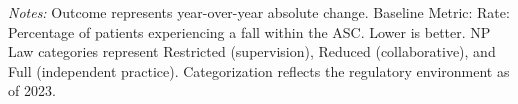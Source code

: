 \begin{table}[htbp]
    \centering
    \caption{Summary of Change in ASC-2: Patient Falls Rate by Authority and Year}
    \label{tab:d_asc_rate_2}
    \vspace{0.2cm}
    \vspace{0.1cm}
    \begin{minipage}{\textwidth}
        \footnotesize \textit{Notes:} Outcome represents year-over-year absolute change. Baseline Metric: Rate: Percentage of patients experiencing a fall within the ASC. Lower is better. NP Law categories represent Restricted (supervision), Reduced (collaborative), and Full (independent practice). Categorization reflects the regulatory environment as of 2023.
    \end{minipage}
\end{table}